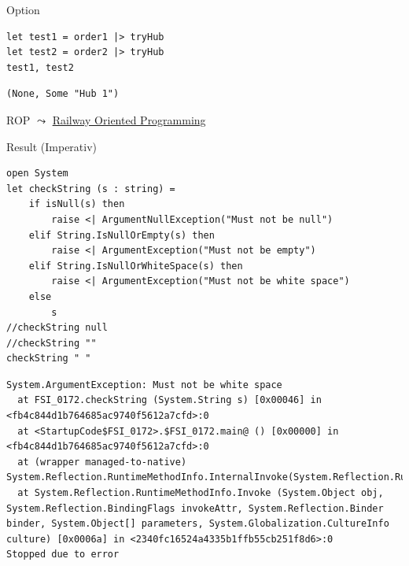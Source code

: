 \documentclass[t]{beamer}
\begin{document}
\begin{frame}[label={sec:orgeb2cf63},fragile]{Option}
 \begin{verbatim}
let test1 = order1 |> tryHub
let test2 = order2 |> tryHub
test1, test2
\end{verbatim}

\begin{verbatim}
(None, Some "Hub 1")
\end{verbatim}
\end{frame}

\begin{frame}[label={sec:org7b2c226}]{ROP}
\(\leadsto\) \href{./2 Railway Oriented Programming.pdf}{Railway Oriented Programming}
\end{frame}

\begin{frame}[label={sec:org097d212},fragile]{Result (Imperativ)}
 \begin{verbatim}
open System
let checkString (s : string) =
    if isNull(s) then
        raise <| ArgumentNullException("Must not be null")
    elif String.IsNullOrEmpty(s) then
        raise <| ArgumentException("Must not be empty")
    elif String.IsNullOrWhiteSpace(s) then
        raise <| ArgumentException("Must not be white space")
    else
        s
//checkString null
//checkString ""
checkString " "
\end{verbatim}

\begin{verbatim}
System.ArgumentException: Must not be white space
  at FSI_0172.checkString (System.String s) [0x00046] in <fb4c844d1b764685ac9740f5612a7cfd>:0 
  at <StartupCode$FSI_0172>.$FSI_0172.main@ () [0x00000] in <fb4c844d1b764685ac9740f5612a7cfd>:0 
  at (wrapper managed-to-native) System.Reflection.RuntimeMethodInfo.InternalInvoke(System.Reflection.RuntimeMethodInfo,object,object[],System.Exception&)
  at System.Reflection.RuntimeMethodInfo.Invoke (System.Object obj, System.Reflection.BindingFlags invokeAttr, System.Reflection.Binder binder, System.Object[] parameters, System.Globalization.CultureInfo culture) [0x0006a] in <2340fc16524a4335b1ffb55cb251f8d6>:0 
Stopped due to error
\end{verbatim}
\end{frame}
\end{document}
